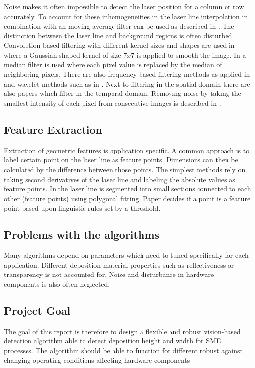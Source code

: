 Noise makes it often impossible to detect the laser position for a column or row accurately. To account for these inhomogeneities in the laser line interpolation in combination with an moving average filter can be used as described in \cite{wang2014weld}. The distinction between the laser line and background regions is often disturbed. Convolution based filtering with different kernel sizes and shapes are used in\cite{huang2012development} where a Gaussian shaped kernel of size $7x7$ is applied to smooth the image. In \cite{zhang2007vision} a median filter is used where each pixel value is replaced by the median of neighboring pixels. There are also frequency based filtering methods as applied in \cite{uzun2005fpga} and wavelet methods such as in \cite{liu2006image}. Next to filtering in the spatial domain there are also papers which filter in the temporal domain. Removing noise by taking the smallest intensity of each pixel from consecutive images is described in \cite{li2010measurement}.

\subsection*{Feature Extraction}
Extraction of geometric features is application specific. A common approach is to label certain point on the laser line as feature points. Dimensions can then be calculated by the difference between those points. The simplest methods \cite{li2010measurement} \cite{huang2012development} rely on taking second derivatives of the laser line and labeling the absolute values as feature points. In \cite{kim1995robust} the laser line is segmented into small sections connected to each other (feature points) using polygonal fitting. Paper \cite{davis2011vision} decides if a point is a feature point based upon linguistic rules set by a threshold. 

\subsection*{Problems with the algorithms}
Many algorithms depend on parameters which need to tuned specifically for each application.  Different deposition material properties such as reflectiveness or transparency is not accounted for. Noise and disturbance in hardware components is also often neglected. 

\subsection*{Project Goal}
The goal of this report is therefore to design a flexible and robust vision-based detection algorithm able to detect deposition height and width for SME processes. The algorithm should be able to function for different robust against changing operating conditions affecting hardware components


